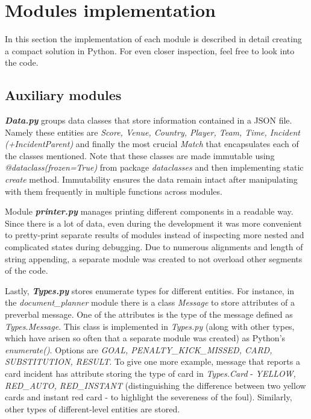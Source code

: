 \section{Modules implementation}
In this section the implementation of each module is described in detail creating a compact solution in Python. For even closer inspection, feel free to look into the code.

\subsection{Auxiliary modules}\label{subsection:aux}
\textbf{\textit{Data.py}} groups data classes that store information contained in a JSON file. Namely these entities are \emph{Score, Venue, Country, Player, Team, Time, Incident (+IncidentParent)} and finally the most crucial \emph{Match} that encapsulates each of the classes mentioned. Note that these classes are made immutable using \emph{@dataclass(frozen=True)} from package \emph{dataclasses} and then implementing static \emph{create} method. Immutability ensures the data remain intact after manipulating with them frequently in multiple functions across modules. 

Module \textbf{\textit{printer.py}} manages printing different components in a readable way. Since there is a lot of data, even during the development it was more convenient to pretty-print separate results of modules instead of inspecting more nested and complicated states during debugging. Due to numerous alignments and length of string appending, a separate module was created to not overload other segments of the code.

Lastly, \textbf{\textit{Types.py}} stores enumerate types for different entities. For instance, in the \emph{document\_planner} module there is a class \emph{Message} to store attributes of a preverbal message. One of the attributes is the type of the message defined as \emph{Types.Message}. This class is implemented in \emph{Types.py} (along with other types, which have arisen so often that a separate module was created) as Python's \emph{enumerate()}. Options are \emph{GOAL, PENALTY\_KICK\_MISSED, CARD, SUBSTITUTION, RESULT}. To give one more example, message that reports a card incident has attribute storing the type of card in \emph{Types.Card} - \emph{YELLOW, RED\_AUTO, RED\_INSTANT} (distinguishing the difference between two yellow cards and instant red card - to highlight the severeness of the foul). Similarly, other types of different-level entities are stored. 


